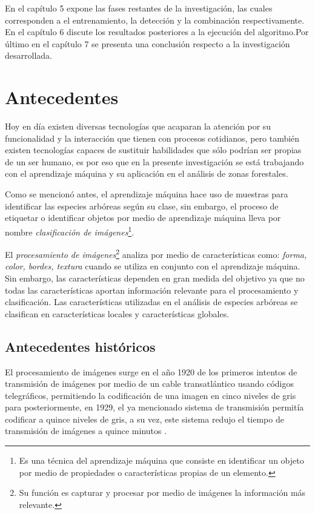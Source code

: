 En el capítulo 5 expone las fases restantes de la investigación, las cuales corresponden a el entrenamiento, la detección y la combinación respectivamente.\\
En el capítulo 6 discute los resultados posteriores a la ejecución del algoritmo.Por último en el capítulo 7 se presenta una conclusión respecto a la investigación desarrollada.

\chapter{Antecedentes}
Hoy en día existen diversas tecnologías que acaparan la atención por su funcionalidad y la interacción que tienen con procesos cotidianos, pero también existen tecnologías capaces de sustituir habilidades que sólo podrían ser propias de un ser humano, es por eso que en la presente investigación se está trabajando con el aprendizaje máquina y su aplicación en el análisis de zonas forestales.

Como se mencionó antes, el aprendizaje máquina hace uso de muestras para identificar las especies arbóreas según su clase, sin embargo, el proceso de etiquetar o identificar objetos por medio de aprendizaje máquina lleva por nombre \emph{clasificación de imágenes}\footnote{Es una técnica del aprendizaje máquina que consiste en identificar un objeto por medio de propiedades o características propias de un elemento.}.

El \emph{procesamiento de imágenes}\footnote{Su función es capturar y procesar por medio de imágenes la información más relevante.} analiza por medio de características como: \emph{forma, color, bordes, textura} cuando se utiliza en conjunto con el aprendizaje máquina. Sin embargo, las características dependen en gran medida del objetivo ya que no todas las características aportan información relevante para el procesamiento y clasificación. Las características utilizadas en el análisis de especies arbóreas se clasifican en características locales y características globales.

\section{Antecedentes históricos}
El procesamiento de imágenes surge en el año 1920 de los primeros intentos de transmisión de imágenes por medio de un cable transatlántico usando códigos telegráficos, permitiendo la codificación de una imagen en cinco niveles de gris para posteriormente, en 1929, el ya mencionado sistema de transmisión permitía codificar a quince niveles de gris, a su vez, este sistema redujo el tiempo de transmisión de imágenes a quince minutos \citep{rf4}. 

